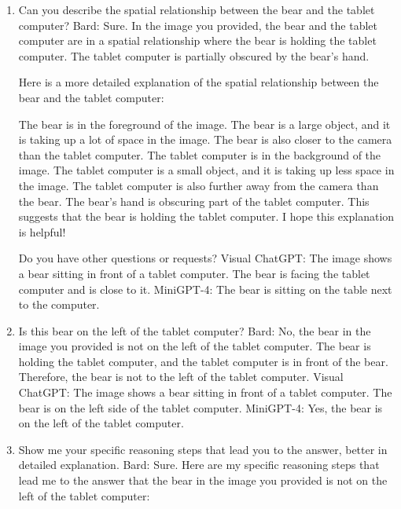 \begin{enumerate}
    \item Can you describe the spatial relationship between the bear and the tablet computer?
    \subitem Bard: Sure. In the image you provided, the bear and the tablet computer are in a spatial relationship where the bear is holding the tablet computer. The tablet computer is partially obscured by the bear's hand.

    Here is a more detailed explanation of the spatial relationship between the bear and the tablet computer:
    
    The bear is in the foreground of the image. The bear is a large object, and it is taking up a lot of space in the image. The bear is also closer to the camera than the tablet computer.
    The tablet computer is in the background of the image. The tablet computer is a small object, and it is taking up less space in the image. The tablet computer is also further away from the camera than the bear.
    The bear's hand is obscuring part of the tablet computer. This suggests that the bear is holding the tablet computer.
    I hope this explanation is helpful!
    
    Do you have other questions or requests?    
    \subitem Visual ChatGPT: The image shows a bear sitting in front of a tablet computer. The bear is facing the tablet computer and is close to it.
    \subitem MiniGPT-4: The bear is sitting on the table next to the computer.
    \item Is this bear on the left of the tablet computer?
    \subitem Bard: 
    No, the bear in the image you provided is not on the left of the tablet computer. The bear is holding the tablet computer, and the tablet computer is in front of the bear. Therefore, the bear is not to the left of the tablet computer.
    \subitem Visual ChatGPT: The image shows a bear sitting in front of a tablet computer. The bear is on the left side of the tablet computer.
    \subitem MiniGPT-4: Yes, the bear is on the left of the tablet computer.
    \item Show me your specific reasoning steps that lead you to the answer, better in detailed explanation.
    \subitem Bard: 
    Sure. Here are my specific reasoning steps that lead me to the answer that the bear in the image you provided is not on the left of the tablet computer:
    

\end{enumerate}
